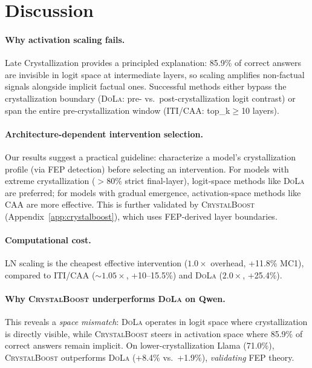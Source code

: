 \documentclass{article}
\newcommand{\iti}{\textsc{ITI}}
\newcommand{\dola}{\textsc{DoLa}}
\newcommand{\crystalboost}{\textsc{CrystalBoost}}
\newcommand{\caa}{\textsc{CAA}}
\begin{document}
\section{Discussion}
\label{sec:discussion}

\paragraph{Why activation scaling fails.} Late Crystallization provides a principled explanation: 85.9\% of correct answers are invisible in logit space at intermediate layers, so scaling amplifies non-factual signals alongside implicit factual ones. Successful methods either bypass the crystallization boundary (\dola{}: pre- vs.\ post-crystallization logit contrast) or span the entire pre-crystallization window (\iti{}/\caa{}: top\_k$\geq$10 layers).

\paragraph{Architecture-dependent intervention selection.} Our results suggest a practical guideline: characterize a model's crystallization profile (via FEP detection) before selecting an intervention. For models with extreme crystallization ($>$80\% strict final-layer), logit-space methods like \dola{} are preferred; for models with gradual emergence, activation-space methods like \caa{} are more effective. This is further validated by \crystalboost{} (Appendix~\ref{app:crystalboost}), which uses FEP-derived layer boundaries.

\paragraph{Computational cost.} LN scaling is the cheapest effective intervention ($1.0\times$ overhead, +11.8\% MC1), compared to \iti{}/\caa{} (${\sim}1.05\times$, +10--15.5\%) and \dola{} ($2.0\times$, +25.4\%).

\paragraph{Why \crystalboost{} underperforms \dola{} on Qwen.} This reveals a \emph{space mismatch}: \dola{} operates in logit space where crystallization is directly visible, while \crystalboost{} steers in activation space where 85.9\% of correct answers remain implicit. On lower-crystallization Llama (71.0\%), \crystalboost{} outperforms \dola{} (+8.4\% vs.\ +1.9\%), \emph{validating} FEP theory.
\end{document}

